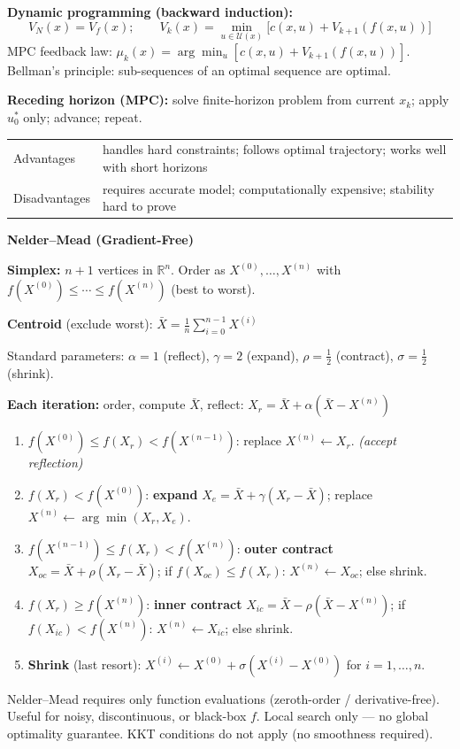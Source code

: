 \documentclass[10pt,a4paper]{article}
\newcommand{\sectionbox}[1]{%
  \begin{mdframed}[backgroundcolor=headbg, linewidth=0pt,
    innertopmargin=4pt, innerbottommargin=4pt,
    innerleftmargin=6pt, innerrightmargin=6pt]
    \large\bfseries\color{white}#1
  \end{mdframed}\vspace{2pt}
}
\newenvironment{algbox}{%
  \begin{mdframed}[backgroundcolor=boxbg, linewidth=0.6pt,
    innertopmargin=6pt, innerbottommargin=6pt,
    innerleftmargin=8pt, innerrightmargin=8pt]
}{%
  \end{mdframed}
}
\newenvironment{notebox}{%
  \begin{mdframed}[backgroundcolor=notebg, linewidth=0.6pt,
    innertopmargin=4pt, innerbottommargin=4pt,
    innerleftmargin=8pt, innerrightmargin=8pt]
}{%
  \end{mdframed}
}
\begin{document}
\textbf{Dynamic programming (backward induction):}
\[
  V_N(x) = V_f(x); \qquad
  V_k(x) = \min_{u\in\mathcal{U}(x)}\bigl[c(x,u)+V_{k+1}(f(x,u))\bigr]
\]
MPC feedback law: $\mu_k(x) = \arg\min_u [c(x,u)+V_{k+1}(f(x,u))]$.\quad
Bellman's principle: sub-sequences of an optimal sequence are optimal.

\textbf{Receding horizon (MPC):} solve finite-horizon problem from current $x_k$; apply $u_0^*$ only; advance; repeat.

\begin{tabular}{@{}ll@{}}
Advantages & handles hard constraints; follows optimal trajectory; works well with short horizons \\
Disadvantages & requires accurate model; computationally expensive; stability hard to prove \\
\end{tabular}

\vspace{4pt}
\sectionbox{Nelder--Mead (Gradient-Free)}

\textbf{Simplex:} $n{+}1$ vertices in $\mathbb{R}^n$. Order as $X^{(0)},\ldots,X^{(n)}$ with
$f(X^{(0)})\le\cdots\le f(X^{(n)})$ (best to worst).

\textbf{Centroid} (exclude worst): $\bar{X}=\tfrac{1}{n}\sum_{i=0}^{n-1}X^{(i)}$

Standard parameters: $\alpha=1$ (reflect),\; $\gamma=2$ (expand),\; $\rho=\tfrac{1}{2}$ (contract),\; $\sigma=\tfrac{1}{2}$ (shrink).

\begin{algbox}
\textbf{Each iteration:} order, compute $\bar{X}$, reflect: $X_r = \bar{X}+\alpha(\bar{X}-X^{(n)})$
\begin{enumerate}
  \item $f(X^{(0)})\le f(X_r)<f(X^{(n-1)})$: replace $X^{(n)}\leftarrow X_r$. \textit{(accept reflection)}
  \item $f(X_r)<f(X^{(0)})$: \textbf{expand} $X_e=\bar{X}+\gamma(X_r-\bar{X})$;\;
        replace $X^{(n)}\leftarrow\arg\min(X_r,X_e)$.
  \item $f(X^{(n-1)})\le f(X_r)<f(X^{(n)})$: \textbf{outer contract} $X_{oc}=\bar{X}+\rho(X_r-\bar{X})$;\;
        if $f(X_{oc})\le f(X_r)$: $X^{(n)}\leftarrow X_{oc}$; else shrink.
  \item $f(X_r)\ge f(X^{(n)})$: \textbf{inner contract} $X_{ic}=\bar{X}-\rho(\bar{X}-X^{(n)})$;\;
        if $f(X_{ic})<f(X^{(n)})$: $X^{(n)}\leftarrow X_{ic}$; else shrink.
  \item \textbf{Shrink} (last resort): $X^{(i)}\leftarrow X^{(0)}+\sigma(X^{(i)}-X^{(0)})$ for $i=1,\ldots,n$.
\end{enumerate}
\end{algbox}

\begin{notebox}
Nelder--Mead requires only function evaluations (zeroth-order / derivative-free).\quad
Useful for noisy, discontinuous, or black-box $f$.\quad
Local search only --- no global optimality guarantee.\quad
KKT conditions do not apply (no smoothness required).
\end{notebox}
\end{document}
